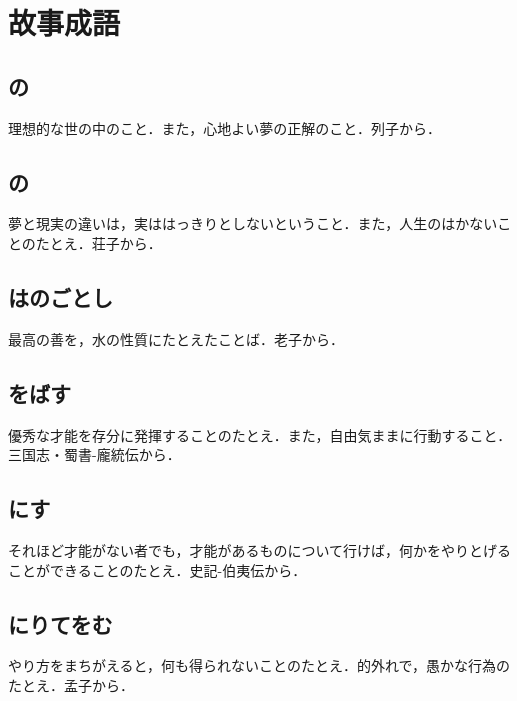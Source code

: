 ﻿%

        \section{故事成語}
            \subsection{の}
            理想的な世の中のこと．また，心地よい夢の正解のこと．列子から．
                
            \subsection{の}
            夢と現実の違いは，実ははっきりとしないということ．また，人生のはかないことのたとえ．荘子から．
                
            \subsection{はのごとし}
            最高の善を，水の性質にたとえたことば．老子から．

            \subsection{をばす}
            優秀な才能を存分に発揮することのたとえ．また，自由気ままに行動すること．三国志・蜀書-龐統伝から．

            \subsection{にす}
            それほど才能がない者でも，才能があるものについて行けば，何かをやりとげることができることのたとえ．史記-伯夷伝から．

            \subsection{にりてをむ}
            やり方をまちがえると，何も得られないことのたとえ．的外れで，愚かな行為のたとえ．孟子から．

